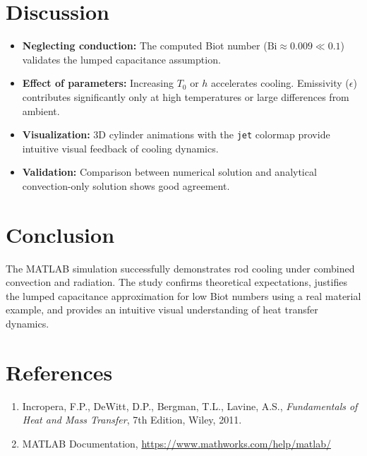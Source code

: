 \documentclass[12pt,a4paper]{article}
\begin{document}
\section{Discussion}
\begin{itemize}
\item \textbf{Neglecting conduction:} The computed Biot number (\(\text{Bi} \approx 0.009 \ll 0.1\)) validates the lumped capacitance assumption.
\item \textbf{Effect of parameters:} Increasing \(T_0\) or \(h\) accelerates cooling. Emissivity (\(\epsilon\)) contributes significantly only at high temperatures or large differences from ambient.
\item \textbf{Visualization:} 3D cylinder animations with the \texttt{jet} colormap provide intuitive visual feedback of cooling dynamics.
\item \textbf{Validation:} Comparison between numerical solution and analytical convection-only solution shows good agreement.
\end{itemize}

\section{Conclusion}
The MATLAB simulation successfully demonstrates rod cooling under combined convection and radiation. The study confirms theoretical expectations, justifies the lumped capacitance approximation for low Biot numbers using a real material example, and provides an intuitive visual understanding of heat transfer dynamics.

\section{References}
\begin{enumerate}
\item Incropera, F.P., DeWitt, D.P., Bergman, T.L., Lavine, A.S., \textit{Fundamentals of Heat and Mass Transfer}, 7th Edition, Wiley, 2011.
\item MATLAB Documentation, \url{https://www.mathworks.com/help/matlab/}
\end{enumerate}
\end{document}
